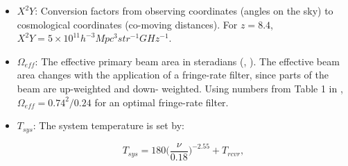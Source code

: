 \documentclass[preprint2,numberedappendix,tighten]{aastex6}  %
\begin{document}
\begin{itemize}
\item $X^{2}Y$: Conversion factors from observing coordinates (angles on the sky) to cosmological coordinates (co-moving 
distances). For $z=8.4$, $X^{2}Y = 5 \times 10^{11} h^{-3} Mpc^{3} str^{-1} GHz^{-1}$.
\item $\Omega_{eff}$: The effective primary beam area in steradians (\citealt{parsons_et_al2010}, \citealt{pober_et_al2012}). 
The effective beam area changes with the application of a fringe-rate filter, since parts of the beam are up-weighted and down-
weighted. Using numbers from Table 1 in \citet{parsons_et_al2016}, $\Omega_{eff} = 0.74^{2}/0.24$ for an optimal fringe-rate 
filter. 
\item $T_{sys}$: The system temperature is set by:

\begin{equation}
\label{eq:sys}
T_{sys} = 180\Big(\frac{\nu}{0.18}\Big)^{-2.55} + T_{rcvr},
\end{equation}


\end{itemize}
\end{document}
